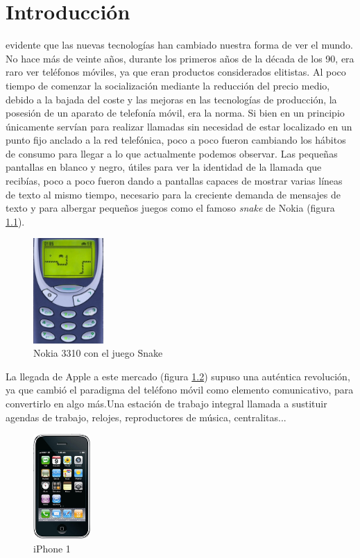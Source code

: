\chapter{Introducción}
\label{chap:introduccion}

 evidente que las nuevas tecnologías han cambiado nuestra forma de ver el mundo. No hace más de veinte años, durante los primeros años de la década de los 90, era raro ver teléfonos móviles, ya que eran productos considerados elitistas. Al poco tiempo de comenzar la socialización mediante la reducción del precio medio, debido a la bajada del coste y las mejoras en las tecnologías de producción, la posesión de un aparato de telefonía móvil, era la norma. Si bien en un principio únicamente servían para realizar llamadas sin necesidad de estar localizado en un punto fijo anclado a la red telefónica, poco a poco fueron cambiando los hábitos de consumo para llegar a lo que actualmente podemos observar. Las pequeñas pantallas en blanco y negro, útiles para ver la identidad de la llamada que recibías, poco a poco fueron dando a pantallas capaces de mostrar varias líneas de texto al mismo tiempo, necesario para la creciente demanda de mensajes de texto y para albergar pequeños juegos como el famoso \textit{snake} de Nokia (figura \ref{fig:Nokia_snake}). 

\begin{figure}[hbtp]
\centering
\includegraphics[height=40mm, fbox={\fboxrule} 4mm]{images/introduccion/Nokia_snake.jpg}
\caption{Nokia 3310 con el juego Snake}
\label{fig:Nokia_snake}
\end{figure}

La llegada de Apple a este mercado (figura \ref{fig:Iphone}) supuso una auténtica revolución, ya que cambió el paradigma del teléfono móvil como elemento comunicativo, para convertirlo en algo más.Una estación de trabajo integral llamada a sustituir agendas de trabajo, relojes, reproductores de música, centralitas...\\

\begin{figure}[hbtp]
\centering
\includegraphics[height=40mm, fbox={\fboxrule} 4mm]{images/introduccion/Iphone1.jpg}
\caption{iPhone 1}
\label{fig:Iphone}
\end{figure}


